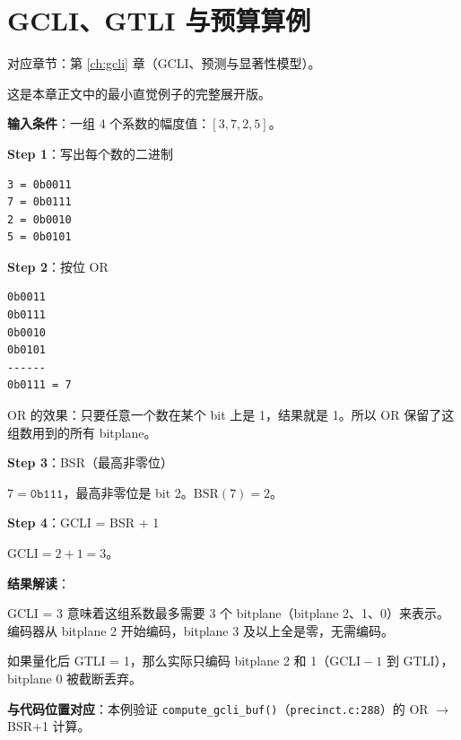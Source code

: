 
\chapter{GCLI、GTLI 与预算算例}\label{ex:gcli-gtli-budget}

对应章节：第 \ref{ch:gcli} 章（GCLI、预测与显著性模型）。

\begin{examplebox}[title={例 1：极小例子——从 4 个系数到 GCLI}]

这是本章正文中的最小直觉例子的完整展开版。

\medskip
\textbf{输入条件}：一组 4 个系数的幅度值：$[3, 7, 2, 5]$。

\medskip
\textbf{Step 1}：写出每个数的二进制

\begin{lstlisting}[numbers=none]
3 = 0b0011
7 = 0b0111
2 = 0b0010
5 = 0b0101
\end{lstlisting}

\textbf{Step 2}：按位 OR

\begin{lstlisting}[numbers=none]
0b0011
0b0111
0b0010
0b0101
------
0b0111 = 7
\end{lstlisting}

OR 的效果：只要任意一个数在某个 bit 上是 1，结果就是 1。所以 OR 保留了这组数用到的所有 bitplane。

\textbf{Step 3}：BSR（最高非零位）

$7 = \texttt{0b111}$，最高非零位是 bit 2。$\mathrm{BSR}(7) = 2$。

\textbf{Step 4}：GCLI = BSR + 1

$\mathrm{GCLI} = 2 + 1 = 3$。

\medskip
\textbf{结果解读}：

GCLI = 3 意味着这组系数最多需要 3 个 bitplane（bitplane 2、1、0）来表示。编码器从 bitplane 2 开始编码，bitplane 3 及以上全是零，无需编码。

如果量化后 GTLI = 1，那么实际只编码 bitplane 2 和 1（$\mathrm{GCLI}-1$ 到 $\mathrm{GTLI}$），bitplane 0 被截断丢弃。

\medskip
\textbf{与代码位置对应}：本例验证 \texttt{compute\_gcli\_buf()}（\texttt{precinct.c:288}）的 OR $\to$ BSR+1 计算。
\end{examplebox}

